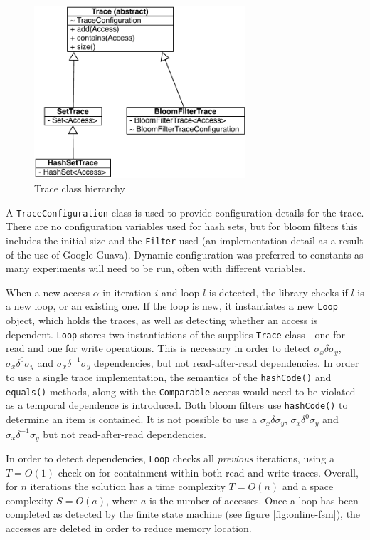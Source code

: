 		\begin{figure}
			\centering
			\includegraphics[width=0.7\textwidth]{graphics/trace-classes.pdf}
			\caption{Trace class hierarchy}
			\label{fig:trace-classes}
		\end{figure}
		
		A \texttt{TraceConfiguration} class is used to provide configuration details for the trace. There are no configuration variables used for hash sets, but for bloom filters this includes the initial size and the \texttt{Filter} used (an implementation detail as a result of the use of Google Guava). Dynamic configuration was preferred to constants as many experiments will need to be run, often with different variables.
		
		When a new access $\alpha$ in iteration $i$ and loop $l$ is detected, the library checks if $l$ is a new loop, or an existing one. If the loop is new, it instantiates a new \texttt{Loop} object, which holds the traces, as well as detecting whether an access is dependent. \texttt{Loop} stores two instantiations of the supplies \texttt{Trace} class - one for read and one for write operations. This is necessary in order to detect $\sigma_x \delta \sigma_y$, $\sigma_x \delta^0 \sigma_y$ and $\sigma_x \delta^{-1} \sigma_y$ dependencies, but not read-after-read dependencies. In order to use a single trace implementation, the semantics of the \texttt{hashCode()} and \texttt{equals()} methods, along with the \texttt{Comparable} access would need to be violated as a temporal dependence is introduced. Both bloom filters use \texttt{hashCode()} to determine an item is contained. It is not possible to use a $\sigma_x \delta \sigma_y$, $\sigma_x \delta^0 \sigma_y$ and $\sigma_x \delta^{-1} \sigma_y$ but not read-after-read dependencies.
		
		In order to detect dependencies, \texttt{Loop} checks all \emph{previous} iterations, using a $T=O(1)$ check on for containment within both read and write traces. Overall, for $n$ iterations the solution has a time complexity $T=O(n)$ and a space complexity $S=O(a)$, where $a$ is the number of accesses. Once a loop has been completed as detected by the finite state machine (see figure \ref{fig:online-fsm}), the accesses are deleted in order to reduce memory location.
		

